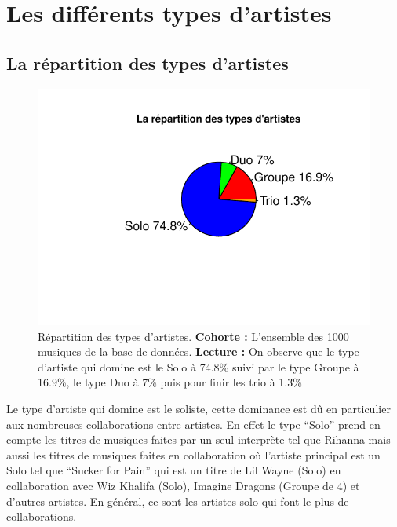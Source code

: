 \documentclass[french,]{compterendu}
\theoremstyle{urcastyle}
\theoremstyle{remark}
\begin{document}
\hypertarget{les-diffuxe9rents-types-dartistes}{%
\section{Les différents types d'artistes}\label{les-diffuxe9rents-types-dartistes}}

\hypertarget{la-ruxe9partition-des-types-dartistes}{%
\subsection{La répartition des types d'artistes}\label{la-ruxe9partition-des-types-dartistes}}





\begin{figure}[ht!]

{\centering \includegraphics{ERTAS_ELIF-CR_SEP0831_files/figure-latex/RepartArtiste-1} 

}

\caption{Répartition des types d'artistes. \newline
\textbf{Cohorte :} L'ensemble des 1000 musiques de la base de données. \newline
\textbf{Lecture :} On observe que le type d'artiste qui domine est le Solo à 74.8\% suivi par le type Groupe à 16.9\%, le type Duo à 7\% puis pour finir les trio à 1.3\%}\label{fig:RepartArtiste}
\end{figure}

Le type d'artiste qui domine est le soliste, cette dominance est dû en particulier aux nombreuses collaborations entre artistes. En effet le type ``Solo'' prend en compte les titres de musiques faites par un seul interprète tel que Rihanna mais aussi les titres de musiques faites en collaboration où l'artiste principal est un Solo tel que ``Sucker for Pain'' qui est un titre de Lil Wayne (Solo) en collaboration avec Wiz Khalifa (Solo), Imagine Dragons (Groupe de 4) et d'autres artistes. En général, ce sont les artistes solo qui font le plus de collaborations.
\end{document}
